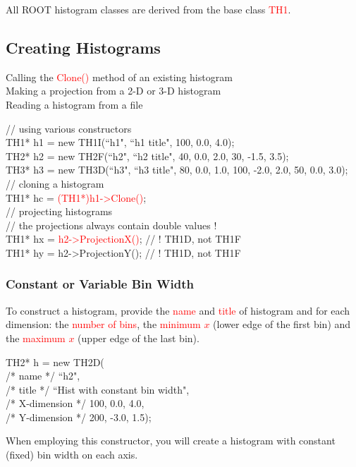 \documentclass[12pt,a4paper]{article}
\begin{document}
All ROOT histogram classes are derived from the base class \textcolor{red}{TH1}.

\subsection{Creating Histograms}

Calling the \textcolor{red}{Clone()} method of an existing histogram \\
Making a projection from a 2-D or 3-D histogram \\
Reading a histogram from a file

// using various constructors \\
TH1* h1 = new TH1I(``h1", ``h1 title", 100, 0.0, 4.0); \\
TH2* h2 = new TH2F(``h2", ``h2 title", 40, 0.0, 2.0, 30, -1.5, 3.5); \\
TH3* h3 = new TH3D(``h3", ``h3 title", 80, 0.0, 1.0, 100, -2.0, 2.0, 50, 0.0, 3.0); \\
// cloning a histogram \\
TH1* hc = \textcolor{red}{(TH1*)h1->Clone()}; \\
// projecting histograms \\
// the projections always contain double values ! \\
TH1* hx = \textcolor{red}{h2->ProjectionX()}; // ! TH1D, not TH1F \\
TH1* hy = h2->ProjectionY(); // ! TH1D, not TH1F

\subsubsection{Constant or Variable Bin Width}
To construct a histogram, provide the \textcolor{red}{name} and \textcolor{red}{title} of histogram and for each dimension: the \textcolor{red}{number of bins}, the \textcolor{red}{minimum $x$} (lower edge of the first bin) and the \textcolor{red}{maximum $x$} (upper edge of the last bin).

TH2* h = new TH2D( \\
/* name */ ``h2", \\
/* title */ ``Hist with constant bin width", \\
/* X-dimension */ 100, 0.0, 4.0, \\
/* Y-dimension */ 200, -3.0, 1.5);

When employing this constructor, you will create a histogram with constant (fixed) bin width on each axis. 
\end{document}
